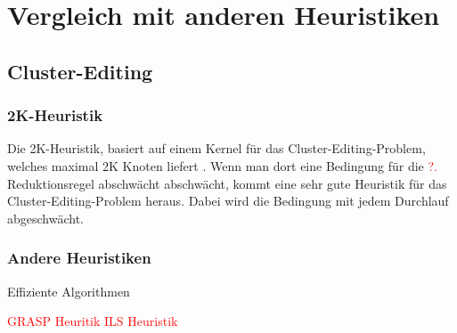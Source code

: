 \documentclass[12pt,a4paper,onecolumn,oneside,titlepage]{article}
\let\oldReturn\Return
\renewcommand{\Return}{\State\oldReturn}
\newcommand\todo[1]{\textcolor{red}{#1}}
\begin{document}
\section{Vergleich mit anderen Heuristiken}
\subsection{Cluster-Editing}
\subsubsection{2K-Heuristik}
Die 2K-Heuristik, basiert auf einem Kernel für das Cluster-Editing-Problem, welches maximal 2K Knoten liefert \cite{Chen12}. Wenn man dort eine Bedingung für die \todo{?.} Reduktionsregel abschwächt  abschwächt, kommt eine sehr gute Heuristik für das Cluster-Editing-Problem heraus. Dabei wird die Bedingung mit jedem Durchlauf abgeschwächt.
\pagebreak
\begin{center}
  \label{euclid}
\begin{algorithmic}[1]
			\EndFor
		\EndIf
	\EndFor
\EndWhile

\EndFunction

	\EndFor

\EndFunction
{}
	\EndFor

\EndFunction
\end{algorithmic}
\end{center}


\subsubsection{Andere Heuristiken}
\cite{Bastos2014} Effiziente Algorithmen

 \todo{GRASP Heuritik}
 \todo{ILS Heuristik}
\end{document}
